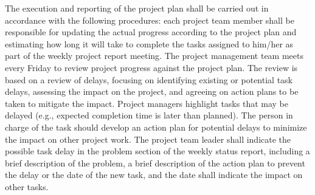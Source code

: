 The execution and reporting of the project plan shall be carried out in accordance with the following procedures: each project team member shall be responsible for updating the actual progress according to the project plan and estimating how long it will take to complete the tasks assigned to him/her as part of the weekly project report meeting. The project management team meets every Friday to review project progress against the project plan. The review is based on a review of delays, focusing on identifying existing or potential task delays, assessing the impact on the project, and agreeing on action plans to be taken to mitigate the impact. Project managers highlight tasks that may be delayed (e.g., expected completion time is later than planned). The person in charge of the task should develop an action plan for potential delays to minimize the impact on other project work. The project team leader shall indicate the possible task delay in the problem section of the weekly status report, including a brief description of the problem, a brief description of the action plan to prevent the delay or the date of the new task, and the date shall indicate the impact on other tasks.